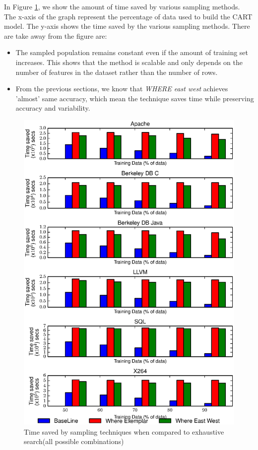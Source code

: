 \documentclass{sig-alternative}
\newcommand{\bi}{\begin{itemize}[leftmargin=0.4cm]}
\newcommand{\ei}{\end{itemize}}
\begin{document}
In Figure \ref{fig:performance_graph}, we show the amount of time saved by various sampling methods. The x-axis of the graph represent the percentage of data used to build the CART model. The y-axis shows the time saved by the various sampling methods. There are take away from the figure are:
\bi
    \item{The sampled population remains constant even if the amount of training set increases. This shows that the method is scalable and only depends on the number of features in the dataset rather than the number of rows.}
    \item{From the previous sections, we know that \textit{WHERE east west} achieves 'almost' same accuracy, which mean the technique saves time while preserving accuracy and variability.}
\ei
\begin{figure}[!t]
\includegraphics[width=0.9\linewidth]{Figures/performance_graph.eps}
\caption{Time saved by sampling techniques when compared to exhaustive search(all possible combinations)}\label{fig:performance_graph}
\end{figure}
\end{document}
